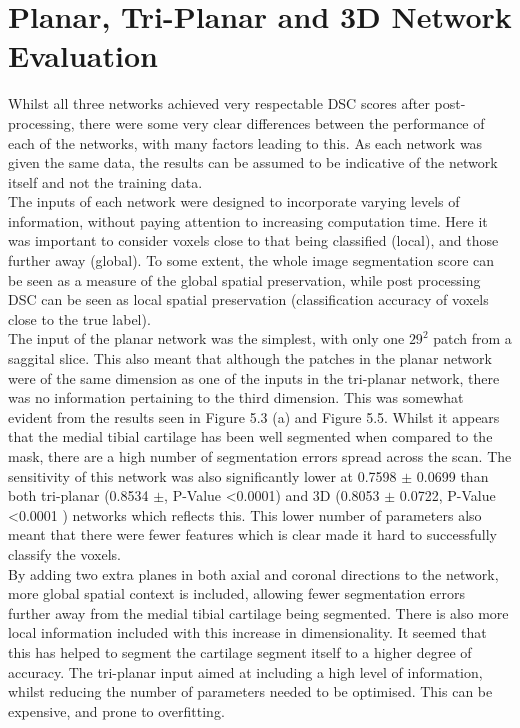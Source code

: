 \documentclass[11pt,a4paper]{memoir}
\numberwithin{figure}{section}
\numberwithin{table}{section}
\numberwithin{equation}{section}
\begin{document}
\section{Planar, Tri-Planar and 3D Network Evaluation}
Whilst all three networks achieved very respectable DSC scores after post-processing, there were some very clear differences between the performance of each of the networks, with many factors leading to this. As each network was given the same data, the results can be assumed to be indicative of the network itself and not the training data.  \\

The inputs of each network were designed to incorporate varying levels of information, without paying attention to increasing computation time. Here it was important to consider voxels close to that being classified (local), and those further away (global). To some extent, the whole image segmentation score can be seen as a measure of the global spatial preservation, while post processing DSC can be seen as local spatial preservation (classification accuracy of voxels close to the true label).\\

The input of the planar network was the simplest, with only one $29^2$ patch from a saggital slice. This also meant that although the patches in the planar network were of the same dimension as one of the inputs in the tri-planar network, there was no information pertaining to the third dimension. This was somewhat evident from the results seen in Figure 5.3 (a) and Figure 5.5. Whilst it appears that the medial tibial cartilage has been well segmented when compared to the mask, there are a high number of segmentation errors spread across the scan. The sensitivity of this network was also significantly lower at 0.7598 $\pm$ 0.0699 than both tri-planar (0.8534 $\pm$, P-Value \textless 0.0001) and 3D (0.8053 $\pm$ 0.0722, P-Value \textless 0.0001 ) networks which reflects this. This lower number of parameters also meant that there were fewer features which is clear made it hard to successfully classify the voxels. \\ 

By adding two extra planes in both axial and coronal directions to the network, more global spatial context is included, allowing fewer segmentation errors further away from the medial tibial cartilage being segmented. There is also more local information included with this increase in dimensionality. It seemed that this has helped to segment the cartilage segment itself to a higher degree of accuracy. The tri-planar input aimed at including a high level of information, whilst reducing the number of parameters needed to be optimised. This can be expensive, and prone to overfitting. \\
\end{document}
